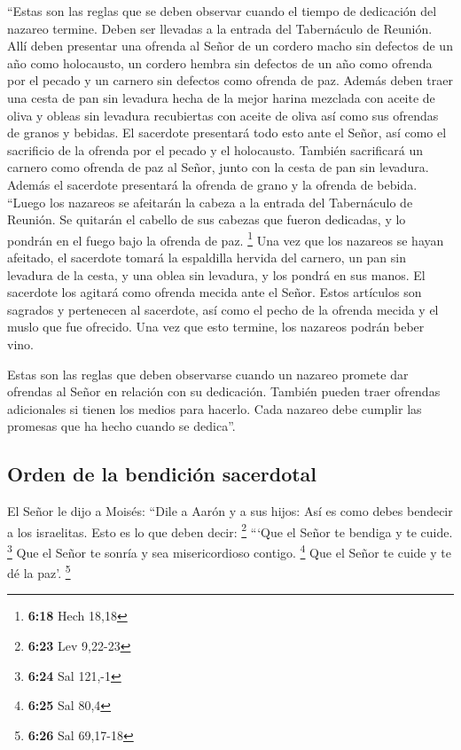  ``Estas son las reglas que se deben observar cuando el
tiempo de dedicación del nazareo termine. Deben ser llevadas a la
entrada del Tabernáculo de Reunión.  Allí deben presentar
una ofrenda al Señor de un cordero macho sin defectos de un año como
holocausto, un cordero hembra sin defectos de un año como ofrenda por el
pecado y un carnero sin defectos como ofrenda de paz. 
Además deben traer una cesta de pan sin levadura hecha de la mejor
harina mezclada con aceite de oliva y obleas sin levadura recubiertas
con aceite de oliva así como sus ofrendas de granos y bebidas.
 El sacerdote presentará todo esto ante el Señor, así
como el sacrificio de la ofrenda por el pecado y el holocausto.
 También sacrificará un carnero como ofrenda de paz al
Señor, junto con la cesta de pan sin levadura. Además el sacerdote
presentará la ofrenda de grano y la ofrenda de bebida. 
``Luego los nazareos se afeitarán la cabeza a la entrada del Tabernáculo
de Reunión. Se quitarán el cabello de sus cabezas que fueron dedicadas,
y lo pondrán en el fuego bajo la ofrenda de paz. \footnote{\textbf{6:18}
  Hech 18,18}  Una vez que los nazareos se hayan
afeitado, el sacerdote tomará la espaldilla hervida del carnero, un pan
sin levadura de la cesta, y una oblea sin levadura, y los pondrá en sus
manos.  El sacerdote los agitará como ofrenda mecida ante
el Señor. Estos artículos son sagrados y pertenecen al sacerdote, así
como el pecho de la ofrenda mecida y el muslo que fue ofrecido. Una vez
que esto termine, los nazareos podrán beber vino.

 Estas son las reglas que deben observarse cuando un
nazareo promete dar ofrendas al Señor en relación con su dedicación.
También pueden traer ofrendas adicionales si tienen los medios para
hacerlo. Cada nazareo debe cumplir las promesas que ha hecho cuando se
dedica''.

\hypertarget{orden-de-la-bendiciuxf3n-sacerdotal}{%
\subsection{Orden de la bendición
sacerdotal}\label{orden-de-la-bendiciuxf3n-sacerdotal}}

 El Señor le dijo a Moisés:  ``Dile a
Aarón y a sus hijos: Así es como debes bendecir a los israelitas. Esto
es lo que deben decir: \footnote{\textbf{6:23} Lev 9,22-23}
 ```Que el Señor te bendiga y te cuide. \footnote{\textbf{6:24}
  Sal 121,-1}  Que el Señor te sonría y sea
misericordioso contigo. \footnote{\textbf{6:25} Sal 80,4}
 Que el Señor te cuide y te dé la paz'. \footnote{\textbf{6:26}
  Sal 69,17-18}

